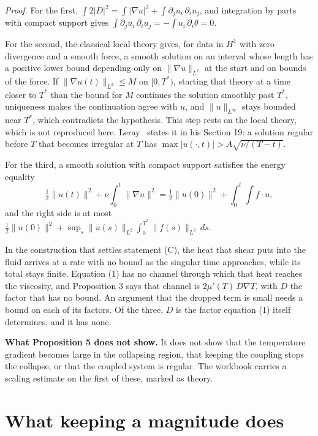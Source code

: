\emph{Proof.} For the first,
$\int 2|D|^2 = \int|\nabla u|^2 + \int \partial_j u_i\,\partial_i u_j$, and integration by parts with
compact support gives $\int \partial_j u_i\,\partial_i u_j = -\int u_i\,\partial_i\theta = 0$.

For the second, the classical local theory gives, for data in $H^1$ with zero divergence and a smooth
force, a smooth solution on an interval whose length has a positive lower bound depending only on
$\|\nabla u\|_{L^2}$ at the start and on bounds of the force. If $\|\nabla u(t)\|_{L^2} \le M$ on
$[0,T^*)$, starting that theory at a time closer to $T^*$ than the bound for $M$ continues the
solution smoothly past $T^*$, uniqueness makes the continuation agree with $u$, and $\|u\|_{L^\infty}$
stays bounded near $T^*$, which contradicts the hypothesis. This step rests on the local theory,
which is not reproduced here. Leray~\cite{src:Leray-1934} states it in his Section 19: a solution
regular before $T$ that becomes irregular at $T$ has $\max|u(\cdot,t)| > A\sqrt{\nu/(T-t)}$.

For the third, a smooth solution with compact support satisfies the energy equality
\[
\tfrac12\|u(t)\|^2 + \nu\int_0^t\|\nabla u\|^2 = \tfrac12\|u(0)\|^2 + \int_0^t\!\!\int f\cdot u ,
\]
and the right side is at most
$\tfrac12\|u(0)\|^2 + \sup_s\|u(s)\|_{L^2}\int_0^{T^*}\|f(s)\|_{L^2}\,ds$. \hfill\qedsymbol

In the construction that settles statement (C), the heat that shear puts into the fluid arrives at a
rate with no bound as the singular time approaches, while its total stays finite. Equation (1) has
no channel through which that heat reaches the viscosity, and Proposition 3 says that channel is
$2\mu'(T)\,D\nabla T$, with $D$ the factor that has no bound. An argument that the dropped term is
small needs a bound on each of its factors. Of the three, $D$ is the factor equation (1) itself
determines, and it has none.

\textbf{What Proposition 5 does not show.} It does not show that the temperature gradient becomes
large in the collapsing region, that keeping the coupling stops the collapse, or that the coupled
system is regular. The workbook carries a scaling estimate on the first of these, marked as theory.

\section{What keeping a magnitude does}

